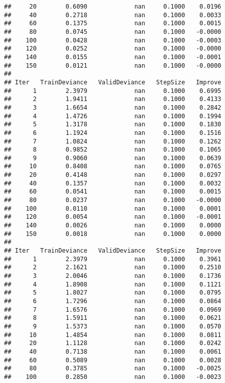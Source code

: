 \documentclass[]{article}
\begin{document}
\begin{verbatim}
##     20        0.6090             nan     0.1000    0.0196
##     40        0.2718             nan     0.1000    0.0033
##     60        0.1375             nan     0.1000    0.0015
##     80        0.0745             nan     0.1000   -0.0000
##    100        0.0428             nan     0.1000   -0.0003
##    120        0.0252             nan     0.1000   -0.0000
##    140        0.0155             nan     0.1000   -0.0001
##    150        0.0121             nan     0.1000   -0.0000
## 
## Iter   TrainDeviance   ValidDeviance   StepSize   Improve
##      1        2.3979             nan     0.1000    0.6995
##      2        1.9411             nan     0.1000    0.4133
##      3        1.6654             nan     0.1000    0.2842
##      4        1.4726             nan     0.1000    0.1994
##      5        1.3178             nan     0.1000    0.1830
##      6        1.1924             nan     0.1000    0.1516
##      7        1.0824             nan     0.1000    0.1262
##      8        0.9852             nan     0.1000    0.1065
##      9        0.9060             nan     0.1000    0.0639
##     10        0.8408             nan     0.1000    0.0765
##     20        0.4148             nan     0.1000    0.0297
##     40        0.1357             nan     0.1000    0.0032
##     60        0.0541             nan     0.1000    0.0015
##     80        0.0237             nan     0.1000   -0.0000
##    100        0.0110             nan     0.1000    0.0001
##    120        0.0054             nan     0.1000   -0.0001
##    140        0.0026             nan     0.1000    0.0000
##    150        0.0018             nan     0.1000    0.0000
## 
## Iter   TrainDeviance   ValidDeviance   StepSize   Improve
##      1        2.3979             nan     0.1000    0.3961
##      2        2.1621             nan     0.1000    0.2510
##      3        2.0046             nan     0.1000    0.1736
##      4        1.8908             nan     0.1000    0.1121
##      5        1.8027             nan     0.1000    0.0795
##      6        1.7296             nan     0.1000    0.0864
##      7        1.6576             nan     0.1000    0.0969
##      8        1.5911             nan     0.1000    0.0621
##      9        1.5373             nan     0.1000    0.0570
##     10        1.4854             nan     0.1000    0.0811
##     20        1.1128             nan     0.1000    0.0242
##     40        0.7138             nan     0.1000    0.0061
##     60        0.5089             nan     0.1000    0.0028
##     80        0.3785             nan     0.1000   -0.0025
##    100        0.2850             nan     0.1000   -0.0023

\end{verbatim}
\end{document}
